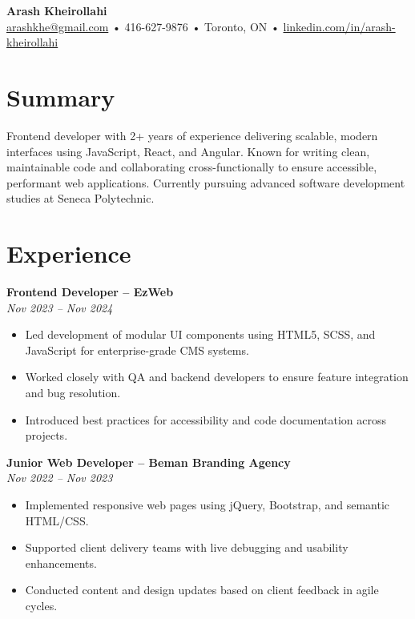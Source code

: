 \documentclass[letterpaper,11pt]{article}
\begin{document}

{\LARGE \textbf{Arash Kheirollahi}}\\
\href{mailto:arashkhe@gmail.com}{arashkhe@gmail.com} • 416-627-9876 • Toronto, ON • \href{https://linkedin.com/in/arash-kheirollahi}{linkedin.com/in/arash-kheirollahi}

\vspace{1.2em}

\section*{Summary}
Frontend developer with 2+ years of experience delivering scalable, modern interfaces using JavaScript, React, and Angular. Known for writing clean, maintainable code and collaborating cross-functionally to ensure accessible, performant web applications. Currently pursuing advanced software development studies at Seneca Polytechnic.

\vspace{0.6em}

\section*{Experience}
\textbf{Frontend Developer – EzWeb}\\
\textit{Nov 2023 -- Nov 2024}\\
\begin{itemize}[leftmargin=*]
  \item Led development of modular UI components using HTML5, SCSS, and JavaScript for enterprise-grade CMS systems.
  \item Worked closely with QA and backend developers to ensure feature integration and bug resolution.
  \item Introduced best practices for accessibility and code documentation across projects.
\end{itemize}

\vspace{0.6em}

\textbf{Junior Web Developer – Beman Branding Agency}\\
\textit{Nov 2022 -- Nov 2023}\\
\begin{itemize}[leftmargin=*]
  \item Implemented responsive web pages using jQuery, Bootstrap, and semantic HTML/CSS.
  \item Supported client delivery teams with live debugging and usability enhancements.
  \item Conducted content and design updates based on client feedback in agile cycles.
\end{itemize}
\end{document}
